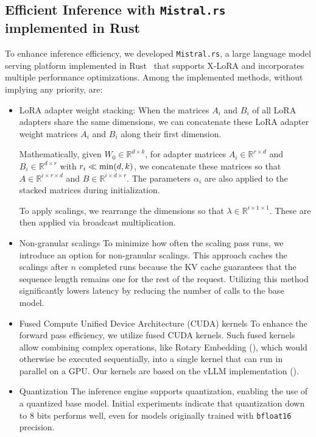 \subsection{Efficient Inference with \texttt{Mistral.rs} implemented in Rust} To enhance inference efficiency, we developed \texttt{Mistral.rs}, a large language model serving platform implemented in Rust~\cite{matsakis2014rust} that supports X-LoRA and incorporates multiple performance optimizations. Among the implemented methods, without implying any priority, are:

\begin{itemize}
    \item LoRA adapter weight stacking: When the matrices $A_i$ and $B_i$ of all LoRA adapters share the same dimensions, we can concatenate these LoRA adapter weight matrices $A_i$ and $B_i$ along their first dimension.

Mathematically, given $W_0 \in \mathbb{R}^{d \times k}$, for adapter matrices $A_i \in \mathbb{R}^{r \times d}$ and $B_i \in \mathbb{R}^{d \times r}$ with $r_i \ll {\rm min} (d,k)$, we concatenate these matrices so that $A\in \mathbb{R}^{i \times r \times d}$ and $B\in \mathbb{R}^{i \times d \times r}$. The parameters $\alpha_i$ are also applied to the stacked matrices during initialization.

To apply scalings, we rearrange the dimensions so that $\lambda \in \mathbb{R}^{i \times 1 \times 1}$. These are then applied via broadcast multiplication.

\item Non-granular scalings To minimize how often the scaling pass runs, we introduce an option for non-granular scalings. This approach caches the scalings after $n$ completed runs because the KV cache guarantees that the sequence length remains one for the rest of the request. Utilizing this method significantly lowers latency by reducing the number of calls to the base model.

\item Fused Compute Unified Device Architecture (CUDA) kernels To enhance the forward pass efficiency, we utilize fused CUDA kernels. Such fused kernels allow combining complex operations, like Rotary Embedding (\cite{su2021roformer}), which would otherwise be executed sequentially, into a single kernel that can run in parallel on a GPU. Our kernels are based on the vLLM implementation (\cite{kwon2023efficient}).

\item Quantization The inference engine supports quantization, enabling the use of a quantized base model. Initial experiments indicate that quantization down to 8 bits performs well, even for models originally trained with \texttt{bfloat16} precision.

\end{itemize}

